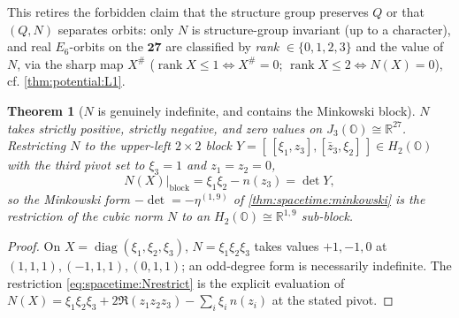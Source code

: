 \documentclass[11pt]{article}
\theoremstyle{plain}
\newtheorem{theorem}{Theorem}[section]
\theoremstyle{definition}
\theoremstyle{remark}
\newcommand{\rank}{\operatorname{rank}}
\newcommand{\diag}{\operatorname{diag}}
\begin{document}
This retires the forbidden claim that the structure group preserves $Q$ or that
$(Q,N)$ separates orbits: only $N$ is structure-group invariant (up to a character),
and real $E_6$-orbits on the $\mathbf{27}$ are classified by \emph{rank}
$\in\{0,1,2,3\}$ and the value of $N$, via the sharp map $X^\#$
($\rank X\le1\Leftrightarrow X^\#=0$; $\rank X\le2\Leftrightarrow N(X)=0$), cf.
\autoref{thm:potential:L1}.

\begin{theorem}[$N$ is genuinely indefinite, and contains the Minkowski block]
\label{thm:spacetime:Nindef}
$N$ takes strictly positive, strictly negative, and zero values on
$J_3(\mathbb O)\cong\mathbb R^{27}$. Restricting $N$ to the upper-left $2\times2$ block
$Y=[\,[\xi_1,z_3],[\bar z_3,\xi_2]\,]\in H_2(\mathbb O)$ with the third pivot set to
$\xi_3=1$ and $z_1=z_2=0$,
\begin{equation}\label{eq:spacetime:Nrestrict}
  N(X)\big|_{\mathrm{block}}=\xi_1\xi_2-n(z_3)=\det Y,
\end{equation}
so the Minkowski form $-\det=-\eta^{(1,9)}$ of \autoref{thm:spacetime:minkowski} is the
restriction of the cubic norm $N$ to an $H_2(\mathbb O)\cong\mathbb R^{1,9}$ sub-block.
\end{theorem}
\begin{proof}
On $X=\diag(\xi_1,\xi_2,\xi_3)$, $N=\xi_1\xi_2\xi_3$ takes values $+1,-1,0$ at
$(1,1,1),(-1,1,1),(0,1,1)$; an odd-degree form is necessarily indefinite. The
restriction \eqref{eq:spacetime:Nrestrict} is the explicit evaluation of
$N(X)=\xi_1\xi_2\xi_3+2\Re(z_1z_2z_3)-\sum_i\xi_i\,n(z_i)$ at the stated pivot.
\end{proof}
\end{document}
